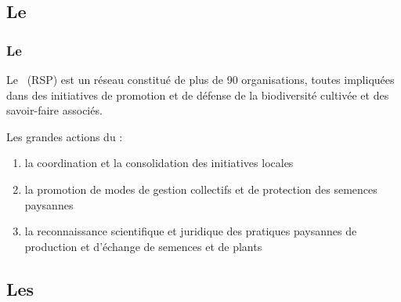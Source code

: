 


\subsection{Le \RSP}

\begin{frame}
\frametitle{Le \RSP}
Le \RSP~(RSP) est un réseau constitué de plus de 90 organisations, toutes impliquées dans des initiatives de promotion et de défense de la biodiversité cultivée et des savoir-faire associés.

\vfill

Les grandes actions du \RSP:

\begin{enumerate}
\item la coordination et la consolidation des initiatives locales
\item la promotion de modes de gestion collectifs et de protection des semences paysannes
\item la reconnaissance scientifique et juridique des pratiques paysannes de production et d'échange de semences et de plants
\end{enumerate}

\end{frame}


\subsection{Les \MSPs}


